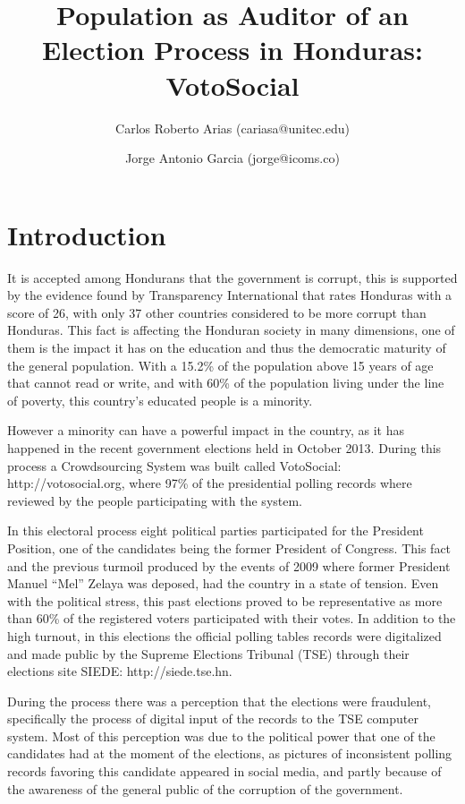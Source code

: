 \documentclass[a4paper,10pt]{article}
\title{Population as Auditor of an Election Process in Honduras: VotoSocial}
\author[1,2]{Carlos Roberto Arias (cariasa@unitec.edu)}
\author[1,3]{Jorge Antonio Garcia (jorge@icoms.co)}
\affil[1]{Facultad de Ingenier\'{i}a, UNITEC, Tegucigalpa, Honduras}
\affil[2]{Instituto de Investigaci\'{o}n de Pol\'{i}ticas P\'{u}blicas, UNITEC, Tegucigalpa, Honduras}
\affil[3]{Icoms Technologies S de RL, Tegucigalpa, Honduras}
\begin{document}
\maketitle

\begin{abstract}

\end{abstract}

\section{Introduction}
It is accepted among Hondurans that the government is corrupt, this is supported by the evidence found by Transparency International that rates Honduras with a score of 26, with only 37 other countries considered to be more corrupt than Honduras. This fact is affecting the Honduran society in many dimensions, one of them is the impact it has on the education and thus the democratic maturity of the general population. With a 15.2\% of the population above 15 years of age that cannot read or write, and with 60\% of the population living under the line of poverty, this country's educated people is a minority.


However a minority can have a powerful impact in the country, as it has happened in the recent government elections held in October 2013. During this process a Crowdsourcing System was built called VotoSocial: http://votosocial.org, where 97\% of the presidential polling records where reviewed by the people participating with the system.


In this electoral process eight political parties participated for the President Position, one of the candidates being the former President of Congress. This fact and the previous turmoil produced by the events of 2009 where former President Manuel “Mel” Zelaya was deposed, had the country in a state of tension. Even with the political stress, this past elections proved to be representative as more than 60\% of the registered voters participated with their votes. In addition to the high turnout, in this elections the official polling tables records were digitalized and made public by the Supreme Elections Tribunal (TSE) through their elections site SIEDE: http://siede.tse.hn.

During the process there was a perception that the elections were fraudulent, specifically the process of digital input of the records to the TSE computer system. Most of this perception was due to the political power that one of the candidates had at the moment of the elections, as pictures of inconsistent polling records favoring this candidate appeared in social media, and partly because of the awareness of the general public of the corruption of the government.
\end{document}
